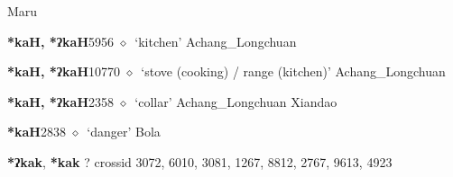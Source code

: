 \begin{list}{}{\leftmargin=1.5em \itemindent=-1.5em}
\hspace{1ex}
         Maru 
  \item {\footnotesize \textbf{*kaH, *ʔkaH}}{\tiny 5956}
\hspace{1ex}
         $\diamond$~`kitchen'
         Achang\_Longchuan 
  \item {\footnotesize \textbf{*kaH, *ʔkaH}}{\tiny 10770}
\hspace{1ex}
         $\diamond$~`stove (cooking) / range (kitchen)'
         Achang\_Longchuan 
  \item {\footnotesize \textbf{*kaH, *ʔkaH}}{\tiny 2358}
\hspace{1ex}
         $\diamond$~`collar'
         Achang\_Longchuan 
\hspace{1ex}
         Xiandao 
  \item {\footnotesize \textbf{*kaH}}{\tiny 2838}
\hspace{1ex}
         $\diamond$~`danger'
         Bola 
  \end{list}
\item
\textbf{*ʔkak}, \textbf{*kak}
?
  {\tiny crossid 3072, 6010, 3081, 1267, 8812, 2767, 9613, 4923}

